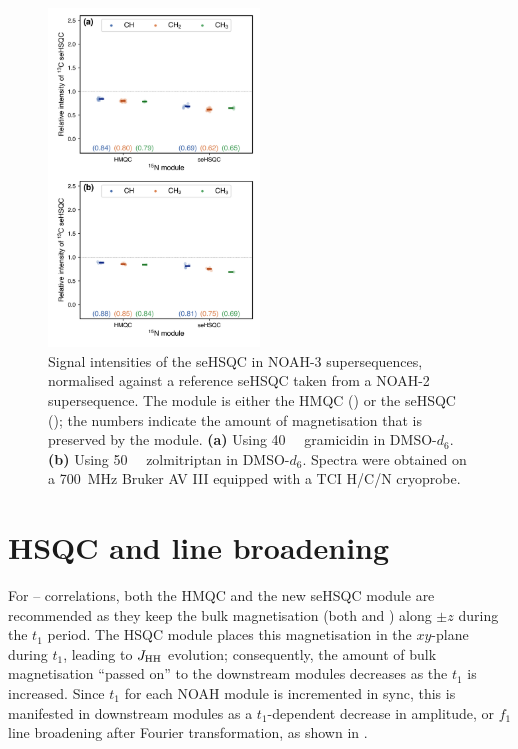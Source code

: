 \begin{figure}
    \centering
    \includegraphics[width=0.5\textwidth]{./figures/n15_bulk_retention.png}
    \caption{
        Signal intensities of the \carbon{} seHSQC in NOAH-3  supersequences, normalised against a reference \carbon{} seHSQC taken from a NOAH-2  supersequence.
        The module \noahX{} is either the \nitrogen{} HMQC (\noahM{}) or the \nitrogen{} seHSQC (\noahSpn{}); the numbers indicate the amount of  magnetisation that is preserved by the \nitrogen{} module.
        \textbf{(a)} Using \SI{40}{\milli\molar} gramicidin in DMSO-$d_6$.
        \textbf{(b)} Using \SI{50}{\milli\molar} zolmitriptan in DMSO-$d_6$.
        Spectra were obtained on a \SI{700}{\MHz} Bruker AV III equipped with a TCI H/C/N cryoprobe.
    }
    \label{fig:n15_bulk_retention}
\end{figure}


\section{\texorpdfstring{\nitrogen{}}{15N} HSQC and line broadening}

For \nitrogen{}--\proton{} correlations, both the HMQC and the new seHSQC module are recommended as they keep the bulk magnetisation (both  and ) along $\pm z$ during the $t_1$ period.
The HSQC module places this magnetisation in the $xy$-plane during $t_1$, leading to $\jhh$ evolution; consequently, the amount of bulk magnetisation ``passed on'' to the downstream modules decreases as the \nitrogen{} $t_1$ is increased.
Since $t_1$ for each NOAH module is incremented in sync, this is manifested in downstream modules as a $t_1$-dependent decrease in amplitude, or $f_1$ line broadening after Fourier transformation, as shown in .

